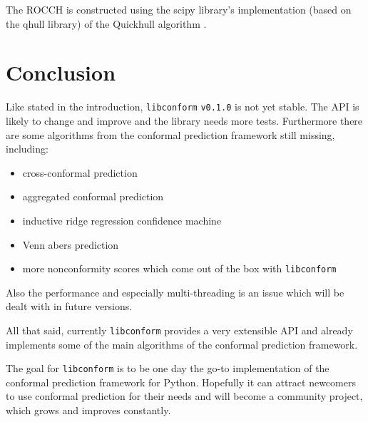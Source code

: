 \documentclass[twoside,11pt]{article}
\def\version{\texttt{v0.1.0}}
\def\libconform{\texttt{libconform}}
\begin{document}
The ROCCH is constructed using the scipy library's
implementation (based on the qhull library) of the
Quickhull algorithm \citep[see][]{scipy,barber_et_al_1996}.

\section{Conclusion}

Like stated in the introduction, \libconform{} \version{}
is not yet stable. The API is likely to change and improve
and the library needs more tests. Furthermore there are
some algorithms from the conformal prediction framework
still missing, including:

\begin{itemize}

  \item cross-conformal prediction
        \citep[see][]{vovk_2012}

  \item aggregated conformal prediction
        \citep[see][]{carlsson_et_al_2014}

  \item inductive ridge regression confidence machine
        \citep[see][]{papadopoulos_et_al_2002}

  \item Venn abers prediction
        \citep[see][]{vovk_et_al_2014}

  \item more nonconformity scores which come out of the box
        with \libconform{}

\end{itemize}
Also the performance and especially multi-threading is an
issue which will be dealt with in future versions.

All that said, currently \libconform{} provides a very
extensible API and already implements some of the main
algorithms of the conformal prediction framework.

The goal for \libconform{} is to be one day
the go-to implementation of the conformal prediction
framework for Python. Hopefully it can attract newcomers to
use conformal prediction for their needs and will become a
community project, which grows and improves constantly.
\end{document}
